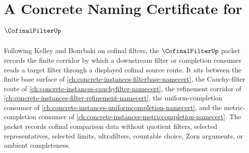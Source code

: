 \chapter{A Concrete Naming Certificate for $\CofinalFilterUp$}
\label{ch:concrete-instances-cofinal-filter-namecert}

Following Kelley and Bourbaki on cofinal filters, the $\CofinalFilterUp$ packet records the finite corridor by which a downstream filter or completion consumer reads a target filter through a displayed cofinal source route. It sits between the finite base surface of \autoref{ch:concrete-instances-filterbase-namecert}, the Cauchy-filter route of \autoref{ch:concrete-instances-cauchyfilter-namecert}, the refinement corridor of \autoref{ch:concrete-instances-filter-refinement-namecert}, the uniform-completion consumer of \autoref{ch:concrete-instances-uniformcompletion-namecert}, and the metric-completion consumer of \autoref{ch:concrete-instances-metriccompletion-namecert}. The packet records cofinal comparison data without quotient filters, selected representatives, selected limits, ultrafilters, countable choice, Zorn arguments, or ambient completeness.


